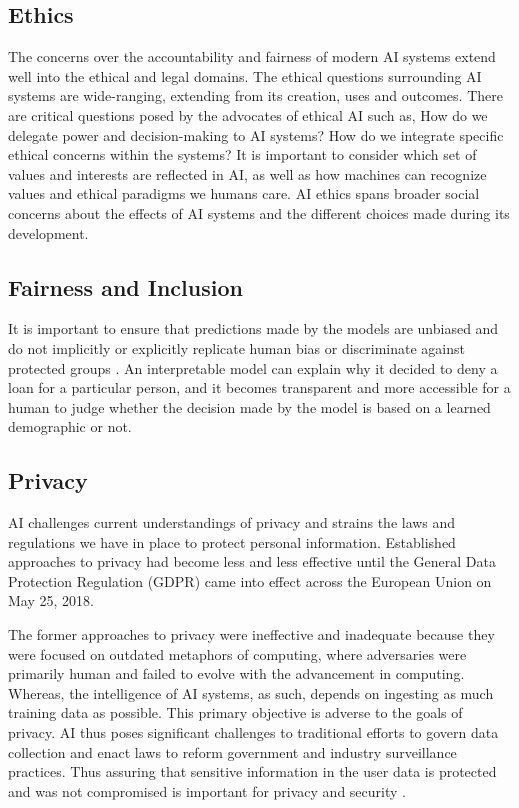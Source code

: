 \subsection{Ethics}

The concerns over the accountability and fairness of modern AI systems extend well into the ethical and legal domains. The ethical questions surrounding AI systems are wide-ranging, extending from its creation, uses and outcomes. There are critical questions posed by the advocates of ethical AI such as, How do we delegate power and decision-making to AI systems? \cite{ainow2016report} How do we integrate specific ethical concerns within the systems? It is important to consider which set of values and interests are reflected in AI, as well as how machines can recognize values and ethical paradigms we humans care. AI ethics spans broader social concerns about the effects of AI systems and the different choices made during its development.

\subsection{Fairness and Inclusion}

It is important to ensure that predictions made by the models are unbiased and do not implicitly or explicitly replicate human bias or discriminate against protected groups \cite{ainow2016report}. An interpretable model can explain why it decided to deny a loan for a particular person, and it becomes transparent and more accessible for a human to judge whether the decision made by the model is based on a learned demographic or not.

\subsection{Privacy}

AI challenges current understandings of privacy and strains the laws and regulations we have in place to protect personal information. Established approaches to privacy had become less and less effective until the General Data Protection Regulation (GDPR) came into effect across the European Union on May 25, 2018.

The former approaches to privacy were ineffective and inadequate because they were focused on outdated metaphors of computing, where adversaries were primarily human and failed to evolve with the advancement in computing. Whereas, the intelligence of AI systems, as such, depends on ingesting as much training data as possible. This primary objective is adverse to the goals of privacy. AI thus poses significant challenges to traditional efforts to govern data collection and enact laws to reform government and industry surveillance practices. Thus assuring that sensitive information in the user data is protected and was not compromised is important for privacy and security \cite{molnar}. 

